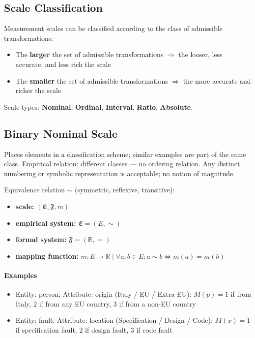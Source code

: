 \subsection{Scale Classification}

Measurement scales can be classified according to the class of admissible transformations:
\begin{itemize}
  \item The \textbf{larger} the set of admissible transformations $\Rightarrow$ the looser,
        less accurate, and less rich the scale
  \item The \textbf{smaller} the set of admissible transformations $\Rightarrow$ the more
        accurate and richer the scale
\end{itemize}

Scale types: \textbf{Nominal}, \textbf{Ordinal}, \textbf{Interval}, \textbf{Ratio}, \textbf{Absolute}.

\subsection{Binary Nominal Scale}

Places elements in a classification scheme; similar examples are part of the same class.
Empirical relation: different classes — no ordering relation.
Any distinct numbering or symbolic representation is acceptable; no notion of magnitude.

Equivalence relation $\sim$ (symmetric, reflexive, transitive):

\begin{itemize}
  \item \textbf{scale:} $(\mathfrak{E},\mathfrak{F},m)$
  \item \textbf{empirical system:} $\mathfrak{E}=(E,\sim)$
  \item \textbf{formal system:} $\mathfrak{F}=(\mathbb{R},=)$
  \item \textbf{mapping function:} $m:E\rightarrow\mathbb{R} \mid \forall a,b\in E:a\sim b\iff m(a)=m(b)$
\end{itemize}

\paragraph{Examples}
\begin{itemize}
  \item Entity: person; Attribute: origin (Italy / EU / Extra-EU):
        $M(p) = 1$ if from Italy, $2$ if from any EU country, $3$ if from a non-EU country
  \item Entity: fault; Attribute: location (Specification / Design / Code):
        $M(x) = 1$ if specification fault, $2$ if design fault, $3$ if code fault
\end{itemize}

